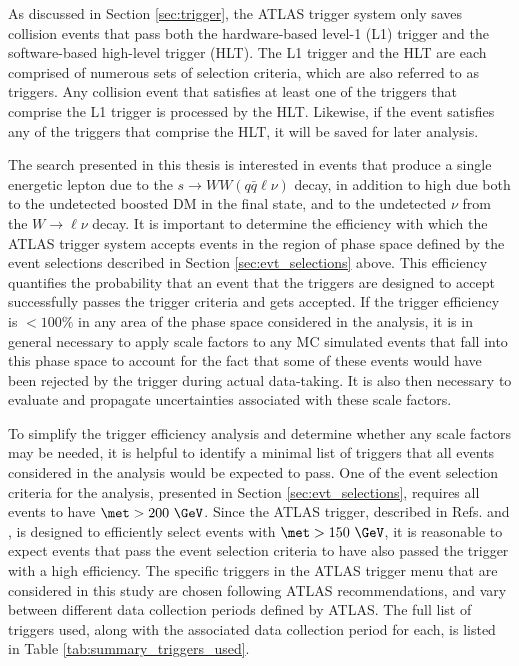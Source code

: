 As discussed in Section \ref{sec:trigger}, the ATLAS trigger system only saves collision events that pass both the hardware-based level-1 (L1) trigger and the software-based high-level trigger (HLT). The L1 trigger and the HLT are each comprised of numerous sets of selection criteria, which are also referred to as triggers. Any collision event that satisfies at least one of the triggers that comprise the L1 trigger is processed by the HLT. Likewise, if the event satisfies any of the triggers that comprise the HLT, it will be saved for later analysis.

The search presented in this thesis is interested in events that produce a single energetic lepton due to the \(s\rightarrow WW(q\bar{q}\ell\nu)\) decay, in addition to high \met due both to the undetected boosted DM in the final state, and to the undetected \(\nu\) from the \(W\rightarrow \ell\nu\) decay. It is important to determine the efficiency with which the ATLAS trigger system accepts events in the region of phase space defined by the event selections described in Section \ref{sec:evt_selections} above. This efficiency quantifies the probability that an event that the triggers are designed to accept successfully passes the trigger criteria and gets accepted. If the trigger efficiency is \(<100\%\) in any area of the phase space considered in the analysis, it is in general necessary to apply scale factors to any MC simulated events that fall into this phase space to account for the fact that some of these events would have been rejected by the trigger during actual data-taking. It is also then necessary to evaluate and propagate uncertainties associated with these scale factors.

To simplify the trigger efficiency analysis and determine whether any scale factors may be needed, it is helpful to identify a minimal list of triggers that all events considered in the analysis would be expected to pass. One of the event selection criteria for the analysis, presented in Section \ref{sec:evt_selections}, requires all events to have \(\met > 200~\GeV\). Since the ATLAS \met trigger, described in Refs. \cite{met_trigger_performance_2020} and \cite{met_performance_2019}, is designed to efficiently select events with \(\met>150~\GeV\), it is reasonable to expect events that pass the event selection criteria to have also passed the \met trigger with a high efficiency. The specific \met triggers in the ATLAS trigger menu that are considered in this study are chosen following ATLAS recommendations, and vary between different data collection periods defined by ATLAS. The full list of \met triggers used, along with the associated data collection period for each, is listed in Table \ref{tab:summary_triggers_used}.

